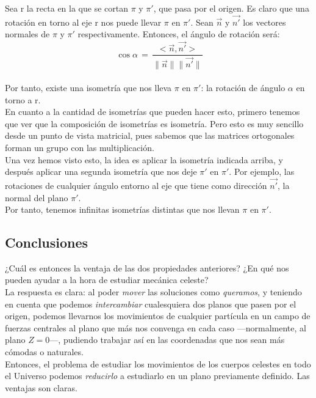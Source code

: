 \documentclass[10pt,a4paper]{article}
\theoremstyle{mystyle}
\begin{document}
Sea r la recta en la que se cortan $\pi$ y $\pi '$, que pasa por el origen. Es claro que una rotación en torno al eje r nos puede llevar $\pi$ en $\pi '$. Sean $\vec{n}$ y $\vec{n'}$ los vectores normales de $\pi$ y $\pi '$ respectivamente. Entonces, el ángulo de rotación será:\\

\[
\ \cos \alpha \, = \, \dfrac{<\vec{n},\vec{n'}>}{\|\vec{n}\|\|\vec{n'}\|}
\]\\

Por tanto, existe una isometría que nos lleva $\pi$ en $\pi '$: la rotación de ángulo $\alpha$ en torno a r.\\

En cuanto a la cantidad de isometrías que pueden hacer esto, primero tenemos que ver que la composición de isometrías es isometría. Pero esto es muy sencillo desde un punto de vista matricial, pues sabemos que las matrices ortogonales forman un grupo con las multiplicación.\\

Una vez hemos visto esto, la idea es aplicar la isometría indicada arriba, y después aplicar una segunda isometría que nos deje $\pi '$ en $\pi '$. Por ejemplo, las rotaciones de cualquier ángulo entorno al eje que tiene como dirección $\vec{n'}$, la normal del plano $\pi '$.\\

Por tanto, tenemos infinitas isometrías distintas que nos llevan $\pi$ en $\pi '$.\\

\subsection{Conclusiones}
¿Cuál es entonces la ventaja de las dos propiedades anteriores? ¿En qué nos pueden ayudar a la hora de estudiar mecánica celeste?\\

La respuesta es clara: al poder \emph{mover} las soluciones como \emph{queramos}, y teniendo en cuenta que podemos \emph{intercambiar} cualesquiera dos planos que pasen por el origen, podemos llevarnos los movimientos de cualquier partícula en un campo de fuerzas centrales al plano que más nos convenga en cada caso ---normalmente, al plano $Z=0$---, pudiendo trabajar así en las coordenadas que nos sean más cómodas o naturales.\\

Entonces, el problema de estudiar los movimientos de los cuerpos celestes en todo el Universo podemos \emph{reducirlo} a estudiarlo en un plano previamente definido. Las ventajas son claras.

\newpage
\nocite{*}


\end{document}
